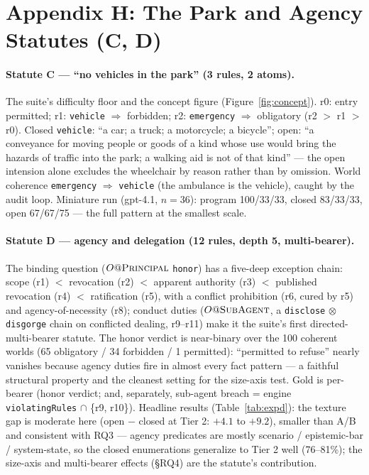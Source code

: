 \section{Appendix H: The Park and Agency Statutes (C, D)}

\paragraph{Statute C --- ``no vehicles in the park'' (3 rules, 2 atoms).}
The suite's difficulty floor and the concept figure
(Figure~\ref{fig:concept}). r0: entry permitted; r1: \texttt{vehicle}
$\Rightarrow$ forbidden; r2: \texttt{emergency} $\Rightarrow$ obligatory
(r2 $>$ r1 $>$ r0). Closed \texttt{vehicle}: ``a car; a truck; a motorcycle;
a bicycle''; open: ``a conveyance for moving people or goods of a kind whose
use would bring the hazards of traffic into the park; a walking aid is not
of that kind'' --- the open intension alone excludes the wheelchair by
reason rather than by omission. World coherence \texttt{emergency}
$\Rightarrow$ \texttt{vehicle} (the ambulance is the vehicle), caught by the
audit loop. Miniature run (gpt-4.1, $n{=}36$): program 100/33/33, closed
83/33/33, open 67/67/75 --- the full pattern at the smallest scale.

\paragraph{Statute D --- agency and delegation (12 rules, depth 5,
multi-bearer).} The binding question ($O@\textsc{Principal}$
\texttt{honor}) has a five-deep exception chain: scope (r1) $<$ revocation
(r2) $<$ apparent authority (r3) $<$ published revocation (r4) $<$
ratification (r5), with a conflict prohibition (r6, cured by r5) and
agency-of-necessity (r8); conduct duties ($O@\textsc{SubAgent}$, a
\texttt{disclose} $\otimes$ \texttt{disgorge} chain on conflicted dealing,
r9--r11) make it the suite's first directed-multi-bearer statute. The honor
verdict is near-binary over the 100 coherent worlds (65 obligatory / 34
forbidden / 1 permitted): ``permitted to refuse'' nearly vanishes because
agency duties fire in almost every fact pattern --- a faithful structural
property and the cleanest setting for the size-axis test. Gold is per-bearer
(honor verdict; and, separately, sub-agent breach = engine
\texttt{violatingRules} $\cap$ \{r9, r10\}). Headline results
(Table~\ref{tab:expd}): the texture gap is moderate here (open $-$ closed at
Tier 2: $+4.1$ to $+9.2$), smaller than A/B and consistent with RQ3 ---
agency predicates are
mostly scenario / epistemic-bar / system-state, so the closed enumerations
generalize to Tier 2 well (76--81\%); the size-axis and multi-bearer effects
(\S RQ4) are the statute's contribution.

